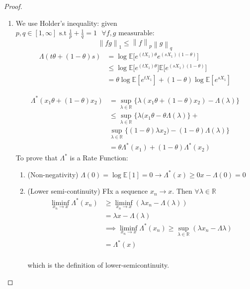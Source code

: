 \documentclass[11pt]{article}
\newcommand{\norm}[1]{\left\lVert#1\right\rVert}
\theoremstyle{break}
\newcommand{\re}{{\mathbb{R}}}
\newcommand{\ep}{{\mathbb{E}}}
\begin{document}
\begin{proof}
\leavevmode
\begin{enumerate}
\item We use Holder's inequality: given \(p,q \in [1,\infty] \text{ s.t } \frac{1}{p}+\frac{1}{q} = 1 \text{ } \forall f,g \text{ measurable}\): 
\begin{equation}
\norm{fg}_1 \leq \norm{f}_p \norm{g}_q
\end{equation}
\begin{eqnarray}
\Lambda(t\theta + (1-\theta)s) &= \log{\ep[{e^{(tX_1)\theta}e^{(sX_1)(1-\theta)}}}]\\
& \leq \log{\ep[{e^{(tX_1)\theta}]\ep[e^{(sX_1)(1-\theta)}}}]\\
&= \theta\log{\ep[e^{tX_1}]} +(1-\theta)\log{\ep[e^{sX_1}]}
\end{eqnarray}

\begin{eqnarray}
\Lambda^*(x_1\theta + (1-\theta)x_2) &= \sup\limits_{\lambda \in \re}\{\lambda(x_1\theta + (1-\theta)x_2) - \Lambda(\lambda)\} \\
& \leq \sup\limits_{\lambda \in \re}\{\lambda(x_1\theta -\theta\Lambda(\lambda)\} + \\ &   \sup\limits_{\lambda\in\re}\{(1-\theta)\lambda x_2) - (1-\theta)\Lambda(\lambda)\} \\
&= \theta\Lambda^*(x_1) + (1-\theta)\Lambda^*(x_2)
\end{eqnarray}
To prove that \(\Lambda^*\) is a Rate Function:
\begin{enumerate}

\item (Non-negativity) \(\Lambda(0) = \log{\ep[1]} = 0 \rightarrow \Lambda^*(x) \geq 0x - \Lambda(0) = 0\)
\item (Lower semi-continuity) FIx a sequence \(x_n \rightarrow x\). Then \(\forall \lambda\in\re\) 
\begin{eqnarray}
\liminf\limits_{x_n\rightarrow x} \Lambda^* \left(x_n\right) &\geq \liminf\limits_{x_n\rightarrow x} \left(\lambda x_n -\Lambda\left(\lambda\right) \right) \\
&=\lambda x - \Lambda\left(\lambda\right) \\
&\implies \liminf\limits_{x_n\rightarrow x} \Lambda^* \left(x_n\right) \geq \sup\limits_{\lambda \in \re} \left( \lambda x_n - \Lambda\lambda\right) \\
&= \Lambda^* \left(x\right)
\end{eqnarray}
\\
which is the definition of lower-semicontinuity.
\end{enumerate}


\end{enumerate}
\end{proof}
\end{document}

